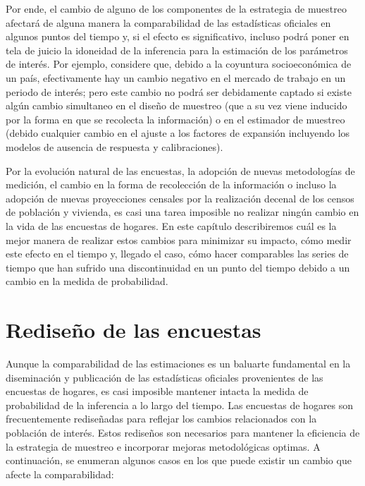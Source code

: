 \documentclass[
  12pt,
]{book}
\begin{document}
Por ende, el cambio de alguno de los componentes de la estrategia de muestreo afectará de alguna manera la comparabilidad de las estadísticas oficiales en algunos puntos del tiempo y, si el efecto es significativo, incluso podrá poner en tela de juicio la idoneidad de la inferencia para la estimación de los parámetros de interés. Por ejemplo, considere que, debido a la coyuntura socioeconómica de un país, efectivamente hay un cambio negativo en el mercado de trabajo en un periodo de interés; pero este cambio no podrá ser debidamente captado si existe algún cambio simultaneo en el diseño de muestreo (que a su vez viene inducido por la forma en que se recolecta la información) o en el estimador de muestreo (debido cualquier cambio en el ajuste a los factores de expansión incluyendo los modelos de ausencia de respuesta y calibraciones).

Por la evolución natural de las encuestas, la adopción de nuevas metodologías de medición, el cambio en la forma de recolección de la información o incluso la adopción de nuevas proyecciones censales por la realización decenal de los censos de población y vivienda, es casi una tarea imposible no realizar ningún cambio en la vida de las encuestas de hogares. En este capítulo describiremos cuál es la mejor manera de realizar estos cambios para minimizar su impacto, cómo medir este efecto en el tiempo y, llegado el caso, cómo hacer comparables las series de tiempo que han sufrido una discontinuidad en un punto del tiempo debido a un cambio en la medida de probabilidad.

\hypertarget{rediseuxf1o-de-las-encuestas}{%
\section{Rediseño de las encuestas}\label{rediseuxf1o-de-las-encuestas}}

Aunque la comparabilidad de las estimaciones es un baluarte fundamental en la diseminación y publicación de las estadísticas oficiales provenientes de las encuestas de hogares, es casi imposible mantener intacta la medida de probabilidad de la inferencia a lo largo del tiempo. Las encuestas de hogares son frecuentemente rediseñadas para reflejar los cambios relacionados con la población de interés. Estos rediseños son necesarios para mantener la eficiencia de la estrategia de muestreo e incorporar mejoras metodológicas optimas. A continuación, se enumeran algunos casos en los que puede existir un cambio que afecte la comparabilidad:
\end{document}
